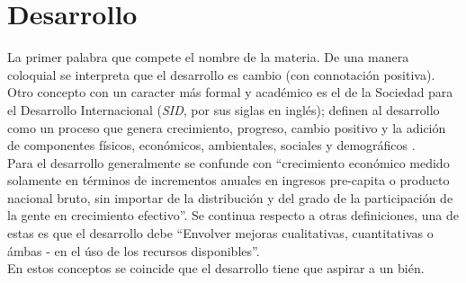 \documentclass[letterpaper, 12pt]{article}
\begin{document}
    \section*{\centering Desarrollo}
    La primer palabra que compete el nombre de la materia. De una manera coloquial se interpreta que el desarrollo es cambio (con connotación positiva). Otro concepto con un caracter más formal y académico
    es el de la Sociedad para el Desarrollo Internacional (\emph{SID}, por sus siglas en inglés); definen al desarrollo como un proceso que genera crecimiento, progreso, cambio positivo y la adición de componentes
    físicos, económicos, ambientales, sociales y demográficos \cite{-2021}.
    \\\newline
    \noindent Para \cite{abuiyada-2018}
    el desarrollo generalmente se confunde con ``crecimiento económico medido solamente en términos de incrementos anuales en ingresos pre-capita o producto nacional bruto, sin importar de la distribución y del grado de la participación de la gente en crecimiento efectivo''.
    Se continua respecto a otras definiciones, una de estas es que el desarrollo debe ``Envolver mejoras cualitativas, cuantitativas o ámbas - en el úso de los recursos disponibles''.
    \\\newline
    \noindent En estos conceptos se coincide que el desarrollo tiene que aspirar a un bién.
\end{document}
